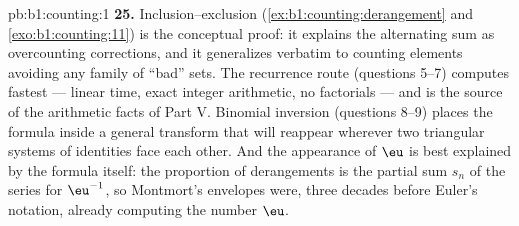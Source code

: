 \begin{solution}{pb:b1:counting:1}
\textbf{25.} Inclusion--exclusion
(\cref{ex:b1:counting:derangement} and \cref{exo:b1:counting:11})
is the conceptual proof: it explains the alternating sum as
overcounting corrections, and it generalizes verbatim to counting
elements avoiding any family of ``bad'' sets. The recurrence route
(questions 5--7) computes fastest --- linear time, exact integer
arithmetic, no factorials --- and is the source of the arithmetic
facts of Part V. Binomial inversion (questions 8--9) places the
formula inside a general transform that will reappear wherever
two triangular systems of identities face each other. And the
appearance of $\eu$ is best explained by the formula itself: the
proportion of derangements is the partial sum $s_n$ of the series
for $\eu^{-1}$, so Montmort's envelopes were, three decades before
Euler's notation, already computing the number $\eu$.
\end{solution}
